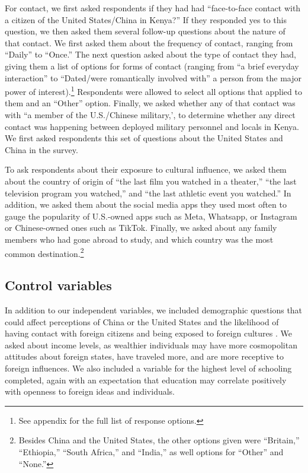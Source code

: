 For contact, we first asked respondents if they had had ``face-to-face contact with a citizen of the United States/China in Kenya?'' If they responded yes to this question, we then asked them several follow-up questions about the nature of that contact. We first asked them about the frequency of contact, ranging from ``Daily'' to ``Once.'' The next question asked about the type of contact they had, giving them a list of options for forms of contact (ranging from ``a brief everyday interaction'' to ``Dated/were romantically involved with'' a person from the major power of interest).\footnote{See appendix for the full list of response options.} Respondents were allowed to select all options that applied to them and an ``Other'' option. Finally, we asked whether any of that contact was with ``a member of the U.S./Chinese military,', to determine whether any direct contact was happening between deployed military personnel and locals in Kenya. We first asked respondents this set of questions about the United States and China in the survey.

To ask respondents about their exposure to cultural influence, we asked them about the country of origin of ``the last film you watched in a theater,'' ``the last television program you watched,'' and ``the last athletic event you watched.'' In addition, we asked them about the social media apps they used most often to gauge the popularity of U.S.-owned apps such as Meta, Whatsapp, or Instagram or Chinese-owned ones such as TikTok. Finally, we asked about any family members who had gone abroad to study, and which country was the most common destination.\footnote{Besides China and the United States, the other options given were ``Britain,'' ``Ethiopia,'' ``South Africa,'' and ``India,'' as well options for ``Other'' and ``None.''}

\subsection*{Control variables} 

In addition to our independent variables, we included demographic questions that could affect perceptions of China or the United States and the likelihood of having contact with foreign citizens and being exposed to foreign cultures \cite{clarke2005}. We asked about income levels, as wealthier individuals may have more cosmopolitan attitudes about foreign states, have traveled more, and are more receptive to foreign influences. We also included a variable for the highest level of schooling completed, again with an expectation that education may correlate positively with openness to foreign ideas and individuals.

